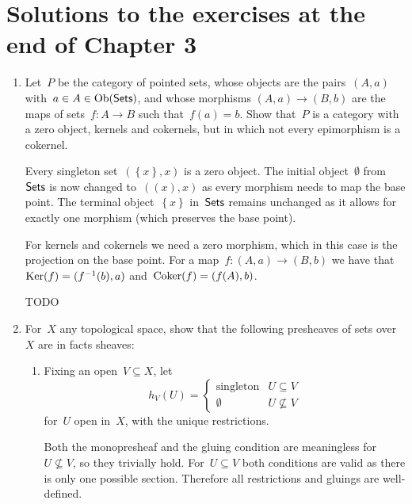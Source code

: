 \documentclass[a4paper,11pt,oneside,openany,article]{memoir}
\begin{document}
\clearpage

\chapter{Solutions to the exercises at the end of Chapter 3}
\begin{enumerate}
  \item Let~$P$ be the category of pointed sets, whose objects are the pairs~$(A,a)$ with~$a\in A\in\operatorname{Ob}(\textsf{Sets})$, and whose morphisms $(A,a)\to(B,b)$ are the maps of sets~$f\colon A\to B$ such that~$f(a)=b$. Show that~$P$ is a category with a zero object, kernels and cokernels, but in which not every epimorphism is a cokernel.

    \begin{solution}
      Every singleton set~$(\left\{ x \right\},x)$ is a zero object. The initial object~$\emptyset$ from~$\textsf{Sets}$ is now changed to~$(\left( x \right),x)$ as every morphism needs to map the base point. The terminal object~$\left\{ x \right\}$ in~$\textsf{Sets}$ remains unchanged as it allows for exactly one morphism (which preserves the base point).

      For kernels and cokernels we need a zero morphism, which in this case is the projection on the base point. For a map~$f\colon(A,a)\to(B,b)$ we have that~$\operatorname{Ker}(f)=(f^{-1}(b),a)$ and~$\operatorname{Coker}(f)=(f(A),b)$.

      TODO
    \end{solution}

  \item For~$X$ any topological space, show that the following presheaves of sets over~$X$ are in facts sheaves:
    \begin{enumerate}
      \item\label{enumerate:exercise-2-a} Fixing an open~$V\subseteq X$, let
        \begin{equation}
          h_V(U)=
          \begin{cases}
            \text{singleton} & U\subseteq V \\
            \emptyset & U\nsubseteq V
          \end{cases}
        \end{equation}
        for~$U$ open in~$X$, with the unique restrictions.

        \begin{solution}
          Both the monopresheaf and the gluing condition are meaningless for~$U\nsubseteq V$, so they trivially hold. For~$U\subseteq V$ both conditions are valid as there is only one possible section. Therefore all restrictions and gluings are well-defined.
        \end{solution}


\end{enumerate}
\end{enumerate}
\end{document}

